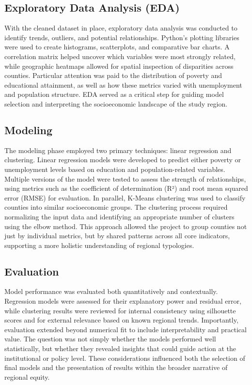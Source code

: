 \documentclass[12pt]{llncs}
\begin{document}
\subsection{Exploratory Data Analysis (EDA)}
With the cleaned dataset in place, exploratory data analysis was conducted to identify trends, outliers, and potential relationships. Python’s plotting libraries were used to create histograms, scatterplots, and comparative bar charts. A correlation matrix helped uncover which variables were most strongly related, while geographic heatmaps allowed for spatial inspection of disparities across counties. Particular attention was paid to the distribution of poverty and educational attainment, as well as how these metrics varied with unemployment and population structure. EDA served as a critical step for guiding model selection and interpreting the socioeconomic landscape of the study region.
\subsection{Modeling}
The modeling phase employed two primary techniques: linear regression and clustering. Linear regression models were developed to predict either poverty or unemployment levels based on education and population-related variables. Multiple versions of the model were tested to assess the strength of relationships, using metrics such as the coefficient of determination (R²) and root mean squared error (RMSE) for evaluation. In parallel, K-Means clustering was used to classify counties into similar socioeconomic groups. The clustering process required normalizing the input data and identifying an appropriate number of clusters using the elbow method. This approach allowed the project to group counties not just by individual metrics, but by shared patterns across all core indicators, supporting a more holistic understanding of regional typologies.
\subsection{Evaluation}
Model performance was evaluated both quantitatively and contextually. Regression models were assessed for their explanatory power and residual error, while clustering results were reviewed for internal consistency using silhouette scores and for external relevance based on known regional trends. Importantly, evaluation extended beyond numerical fit to include interpretability and practical value. The question was not simply whether the models performed well statistically, but whether they revealed insights that could guide action at the institutional or policy level. These considerations influenced both the selection of final models and the presentation of results within the broader narrative of regional equity.
\end{document}
